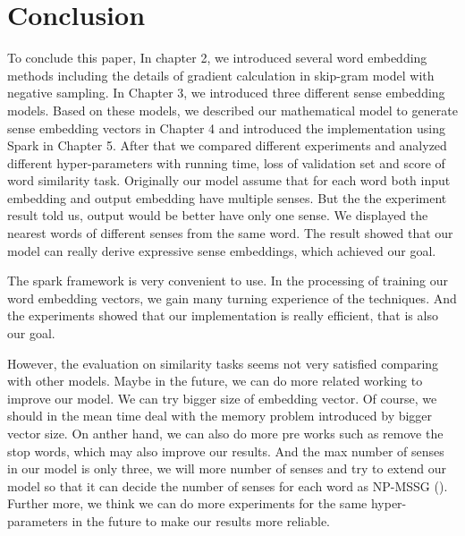 \chapter{Conclusion}
\label{cha:concl}

To conclude this paper, In chapter 2, we introduced several word embedding methods including the details of gradient calculation in skip-gram model with negative sampling. In Chapter 3, we introduced three different sense embedding models. Based on these models, we described our mathematical model to generate sense embedding vectors in Chapter 4 and introduced the implementation using Spark in Chapter 5. After that we compared different experiments and analyzed different hyper-parameters with running time, loss of validation set and score of word similarity task. Originally our model assume that for each word both input embedding and output embedding have multiple senses. But the the experiment result told us, output would be better have only one sense. We displayed the nearest words of different senses from the same word. The result showed that our model can really derive expressive sense embeddings, which achieved our goal.

The spark framework is very convenient to use. In the processing of training our word embedding vectors, we gain many turning experience of the techniques. And the experiments showed that our implementation is really efficient, that is also our goal.

However, the evaluation on similarity tasks seems not very satisfied comparing with other models. Maybe in the future, we can do more related working to improve our model. We can try bigger size of embedding vector. Of course, we should in the mean time deal with the memory problem introduced by bigger vector size. On anther hand, we can also do more pre works such as remove the stop words, which may also improve our results. And the max number of senses in our model is only three, we will more number of senses and try to extend our model so that it can decide the number of senses for each word as NP-MSSG (\citep{NeelakantanShankarEtAl2015}). Further more, we think we can do more experiments for the same hyper-parameters in the future to make our results more reliable.
